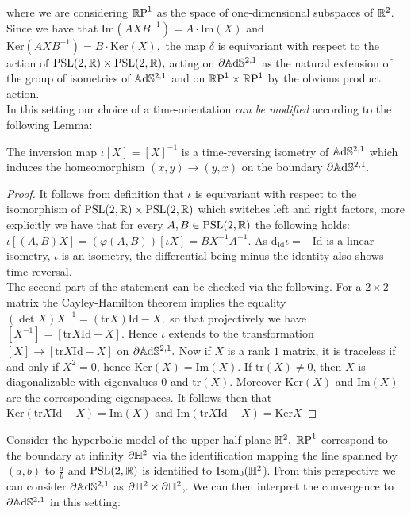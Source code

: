 where we are considering $\mathbb{R}\text{P}^1$ as the space of one-dimensional subspaces of $\mathbb{R}^2$. Since we have that $\text{Im}(AXB^{-1})=A\cdot\text{Im}(X)$ and $\text{Ker} (AXB^{-1})=B\cdot\text{Ker}(X),$ the map $\delta$ is equivariant with respect to the action of $\text{PSL}(2,\mathbb{R})\times\text{PSL}(2,\mathbb{R}),$ acting on $\partial\mathbb{A}\mathrm{d}\mathbb{S}^{2,1}$ as the natural extension of the group of isometries of $\mathbb{A}\mathrm{d}\mathbb{S}^{2,1}$ and on $\mathbb{R}\text{P}^1\times\mathbb{R}\text{P}^1$ by the obvious product action.\\
In this setting our choice of a time-orientation \textit{can be modified} according to the following Lemma:
\begin{lemma}\label{invertime}
    The inversion map $\iota[X]=[X]^{-1}$ is a time-reversing isometry of $\mathbb{A}\mathrm{d}\mathbb{S}^{2,1}$ which induces the homeomorphism $(x,y)\to(y,x)$ on the boundary $\partial\mathbb{A}\mathrm{d}\mathbb{S}^{2,1}.$
\end{lemma}
\begin{proof}
    It follows from definition that $\iota$ is equivariant with respect to the isomorphism of $\text{PSL}(2,\mathbb{R})\times\text{PSL}(2,\mathbb{R})$ which switches left and right factors, more explicitly we have that for every $A,B\in\text{PSL}(2,\mathbb{R})$ the following holds: $\iota[(A,B)X]=(\varphi(A,B))[\iota X]=BX^{-1}A^{-1}$. As $\text{d}_\text{Id}\iota=-\text{Id}$ is a linear isometry, $\iota$ is an isometry, the differential being minus the identity also shows time-reversal. \\ 
    The second part of the statement can be checked via the following. For a $2\times2$ matrix the Cayley-Hamilton theorem implies the equality $(\det X)X^{-1}=(\text{tr}X)\text{Id}-X,$ so that projectively we have $[X^{-1}]=[\text{tr}X\text{Id}-X].$ Hence $\iota$ extends to the transformation $[X]\to[\text{tr}X\text{Id}-X]$ on $\partial\mathbb{A}\mathrm{d}\mathbb{S}^{2,1}.$ Now if $X$ is a rank $1$ matrix, it is traceless if and only if $X^2=0$, hence $\text{Ker}(X)=\text{Im}(X).$ If $\text{tr}(X)\neq 0$, then $X$ is diagonalizable with eigenvalues $0$ and $\text{tr}(X)$. Moreover $\text{Ker}(X)$ and $\text{Im}(X)$ are the corresponding eigenspaces. It follows then that $\text{Ker}(\text{tr}X\text{Id}-X)=\text{Im}(X)$ and $\text{Im}(\text{tr}X\text{Id}-X)=\text{Ker}X$ 
\end{proof}


Consider the hyperbolic model of the upper half-plane $\mathbb{H}^2.$ $\mathbb{R}\text{P}^1$ correspond to the boundary at infinity $\partial\mathbb{H}^2$ via the identification mapping the line spanned by $(a,b)$ to $\frac{a}{b}$ and $\text{PSL}(2,\mathbb{R})$ is identified to $\text{Isom}_0(\mathbb{H}^2$). From this perspective we can consider $\partial\mathbb{A}\mathrm{d}\mathbb{S}^{2,1}$ as $\partial\mathbb{H}^2\times\partial\mathbb{H}^2$,. We can then interpret the convergence to $\partial\mathbb{A}\mathrm{d}\mathbb{S}^{2,1}$ in this setting:

